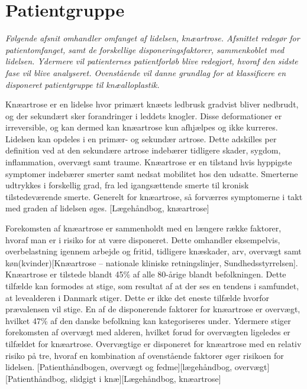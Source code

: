 \section{Patientgruppe}
\textit{Følgende afsnit omhandler omfanget af lidelsen, knæartrose. Afsnittet redegør for patientomfanget, samt de forskellige disponeringsfaktorer, sammenkoblet med lidelsen. Ydermere vil patienternes patientforløb blive redegjort, hvoraf den sidste fase vil blive analyseret. Ovenstående vil danne grundlag for at klassificere en disponeret patientgruppe til knæalloplastik.}

Knæartrose er en lidelse hvor primært knæets ledbrusk gradvist bliver nedbrudt, og der sekundært sker forandringer i leddets knogler. Disse deformationer er irreversible, og kan dermed kan knæartrose kun afhjælpes og ikke kurreres. Lidelsen kan opdeles i en primær- og sekundær artrose. Dette adskilles per definition ved at den sekundære artrose indebærer tidligere skader, sygdom, inflammation, overvægt samt traume. Knæartrose er en tilstand hvis hyppigste symptomer indebærer smerter samt nedsat mobilitet hos den udsatte. Smerterne udtrykkes i forskellig grad, fra led igangsættende smerte til kronisk tilstedeværende smerte. Generelt for knæartrose, så forværres symptomerne i takt med graden af lidelsen øges. [Lægehåndbog, knæartrose]

Forekomsten af knæartrose er sammenholdt med en længere række faktorer, hvoraf man er i risiko for at være disponeret. Dette omhandler eksempelvis, overbelastning igennem arbejde og fritid, tidligere knæskader, arv, overvægt samt køn(kvinder)[Knæartrose – nationale kliniske retningslinjer, Sundhedsstyrrelsen]. Knæartrose er tilstede blandt 45\% af alle 80-årige blandt befolkningen. Dette tilfælde kan formodes at stige, som resultat af at der ses en tendens i samfundet, at levealderen i Danmark stiger. Dette er ikke det eneste tilfælde hvorfor prævalensen vil stige. En af de disponerende faktorer for knæartrose er overvægt, hvilket 47\% af den danske befolkning kan kategoriseres under. Ydermere stiger forekomsten af overvægt med alderen, hvilket forud for overvægten ligeledes er tilfældet for knæartrose. Overvægtige er disponeret for knæartrose med en relativ risiko på tre, hvoraf en kombination af ovenstående faktorer øger risikoen for lidelsen. [Patienthåndbogen, overvægt og fedme][lægehåndbog, overvægt][Patienthåndbog, slidgigt i knæ][Lægehåndbog, knæartrose]

